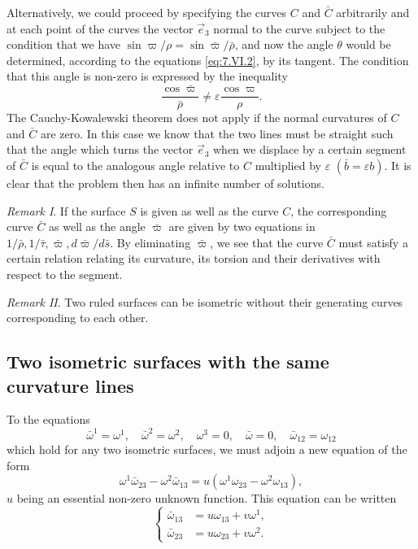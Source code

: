 \documentclass[leqno,11pt]{book}
\numberwithin{equation}{chapter}
\theoremstyle{shape1}
\theoremstyle{shape0}
\theoremstyle{shape2}
\theoremstyle{definition}
\begin{document}
Alternatively,  we could proceed by specifying the curves $C$ and $\bar C$ arbitrarily and at each point of the curves the vector $\vec e_{3}$ normal to the curve subject to the condition that we have $\sin\varpi/\rho=\sin\bar\varpi/\bar\rho$, and now the angle $\theta$ would be determined, according to the equations \eqref{eq:7.VI.2}, by its tangent. The condition that this angle is non-zero is expressed by the inequality
\[
\frac{\cos\bar\varpi}{\bar\rho}\neq\varepsilon\frac{\cos\varpi}{\rho}.
\]
The Cauchy-Kowalewski theorem does not apply if the normal curvatures of $C$ and $\bar C$ are zero. In this case we know that the two lines must be straight such that the angle which turns the vector $\vec e_{3}$ when we displace by a certain segment of $\bar C$ is equal to the analogous angle relative to $C$ multiplied by $\varepsilon$ $(\bar b=\varepsilon b)$. It is clear that the problem then has an infinite number of solutions.

\emph{Remark I}. If the surface $S$ is given as well as the curve $C$, the corresponding curve $\bar C$ as well as the angle $\bar \varpi$ are given by two equations in $1/\bar\rho,1/\bar\tau,\bar\varpi,d\bar\varpi/d\bar s$. By eliminating $\bar\varpi$, we see that the curve $\bar C$ must satisfy a certain relation relating its curvature, its torsion and their derivatives with respect to the segment.

\emph{Remark II}. Two ruled surfaces can be isometric without their generating curves corresponding to each other.


\subsection{Two isometric surfaces with the same curvature lines}
\label{sec:some-isoth-surf-2}

\fsec To the equations
\begin{equation}
  \label{eq:7.VII.1}\tag{VII, 1}
  \bar\omega^{1}=\omega^{1},\quad\bar\omega^{2}=\omega^{2},\quad\omega^{3}=0,\quad\bar\omega=0,\quad\bar\omega_{12}=\omega_{12}
\end{equation}
which hold for any two isometric surfaces, we must adjoin a new equation of the form
\[
\omega^{1}\bar\omega_{23}-\omega^{2}\bar\omega_{13}=u(\omega^{1}\omega_{23}-\omega^{2}\omega_{13}),
\]
$u$ being an essential non-zero unknown function. This equation can be written
\begin{equation}
  \label{eq:7.VII.2}\tag{VII, 2}
  \left\{
    \begin{aligned}
      \bar\omega_{13}&=u\omega_{13}+v\omega^{1},\\
      \bar\omega_{23}&=u\omega_{23}+v\omega^{2}.
    \end{aligned}
  \right.
\end{equation}
\end{document}
